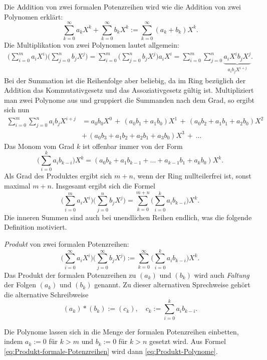 \documentclass[a4paper,11pt,fleqn,twoside]{scrartcl}
\numberwithin{equation}{section}
\newcommand{\strong}[1]{{\normalfont\sffamily\bfseries #1}}
\newenvironment{Definition}{\par\noindent\strong{Definition.}}{\par}
\newcommand{\emdef}[1]{\emph{#1}}
\begin{document}
Die Addition von zwei formalen Potenzreihen wird
wie die Addition von zwei Polynomen erklärt:
\begin{equation}\label{eq:Addition-formale-Potenzreihen}
\sum_{k=0}^\infty a_k X^k + \sum_{k=0}^\infty b_k X^k
:= \sum_{k=0}^\infty (a_k+b_k)X^k.
\end{equation}
Die Multiplikation von zwei Polynomen lautet allgemein:
\begin{align}
\bigg(\sum_{i=0}^m a_i X^i\bigg)\bigg(\sum_{j=0}^n b_j X^j\bigg)
= \sum_{i=0}^m \bigg(\sum_{j=0}^n b_j X^j\bigg) a_i X^i
= \sum_{i=0}^m \sum_{j=0}^n \underbrace{a_i X^i b_j X^j}_{\displaystyle a_ib_j X^{i+j}}.
\end{align}
Bei der Summation ist die Reihenfolge aber beliebig, da im Ring
bezüglich der Addition das Kommutativgesetz und das Assoziativgesetz
gültig ist. Multipliziert man zwei Polynome aus und gruppiert
die Summanden nach dem Grad, so ergibt sich nun
\begin{equation}
\begin{split}
\sum_{i=0}^m \sum_{j=0}^n a_ib_j X^{i+j}
&= a_0 b_0 X^0 \,+\, (a_0 b_1 + a_1 b_0) X^1\,+\,
(a_0 b_2 + a_1 b_1 + a_2 b_0) X^2\\
&+\,(a_0 b_3 + a_1 b_2 + a_2 b_1 + a_3 b_0) X^3\,+\,\ldots
\end{split}
\end{equation}
Das Monom vom Grad $k$ ist offenbar immer von der Form
\begin{equation}
\bigg(\sum_{i=0}^k a_i b_{k-i}\bigg) X^k
= (a_0 b_k + a_1 b_{k-1} + \ldots + a_{k-1} b_1 + a_k b_0) X^k.
\end{equation}
Als Grad des Produktes ergibt sich $m+n$, wenn der Ring
nullteilerfrei ist, sonst maximal $m+n$. Insgesamt ergibt sich
die Formel
\begin{equation}\label{eq:Produkt-Polynome}
\bigg(\sum_{i=0}^m a_i X^i\bigg)\bigg(\sum_{j=0}^n b_j X^j\bigg)
= \sum_{k=0}^{m+n}\bigg(\sum_{i=0}^k a_i b_{k-i}\bigg) X^k.
\end{equation}
Die inneren Summen sind auch bei unendlichen Reihen endlich, was
die folgende Definition motiviert.

\begin{Definition}
\emdef{Produkt} von zwei formalen Potenzreihen:
\begin{equation}\label{eq:Produkt-formale-Potenzreihen}
\bigg(\sum_{i=0}^\infty a_i X^i\bigg)\bigg(\sum_{j=0}^\infty b_j X^j\bigg)
:= \sum_{k=0}^\infty\bigg(\sum_{i=0}^k a_i b_{k-i}\bigg) X^k.
\end{equation}
Das Produkt der formalen Potenzreihen zu $(a_k)$ und $(b_k)$ wird
auch \emdef{Faltung} der Folgen $(a_k)$ und $(b_k)$ genannt.
Zu dieser alternativen Sprechweise gehört die alternative
Schreibweise%
\begin{equation}
(a_k)\ast (b_k) := (c_k),\quad c_k:=\sum_{i=0}^k a_i b_{k-i}.
\end{equation}
\end{Definition}
\noindent
Die Polynome lassen sich in die Menge der formalen Potenzreihen
einbetten, indem $a_k:=0$ für $k>m$ und $b_k:=0$ für $k>n$
gesetzt wird. Aus Formel \eqref{eq:Produkt-formale-Potenzreihen}
wird dann \eqref{eq:Produkt-Polynome}.
\end{document}
